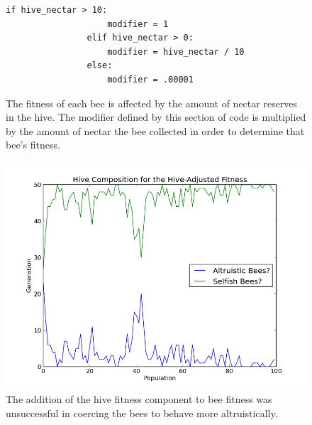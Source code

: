 \documentclass[11pt]{article}
\begin{document}
			\begin{figure}[tb]
				\begin{Verbatim}[frame=single]
                if hive_nectar > 10:
                    modifier = 1
                elif hive_nectar > 0:
                    modifier = hive_nectar / 10
                else:
                    modifier = .00001 
				\end{Verbatim}
				\caption{The fitness of each bee is affected by the amount of nectar reserves in the hive. The modifier defined by this section of code is multiplied by the amount of nectar the bee collected in order to determine that bee's fitness.}
				\label{fig:modifier_algorithm}
			\end{figure}

			\begin{figure}[tb]
				\begin{center}
					\includegraphics[scale=.75]{results/hive_fitness_comp.png}
				\end{center}
				\caption{The addition of the hive fitness component to bee fitness was unsuccessful in coercing the bees to behave more altruistically.}
				\label{fig:hive_fitness_composition}
			\end{figure}
\end{document}
